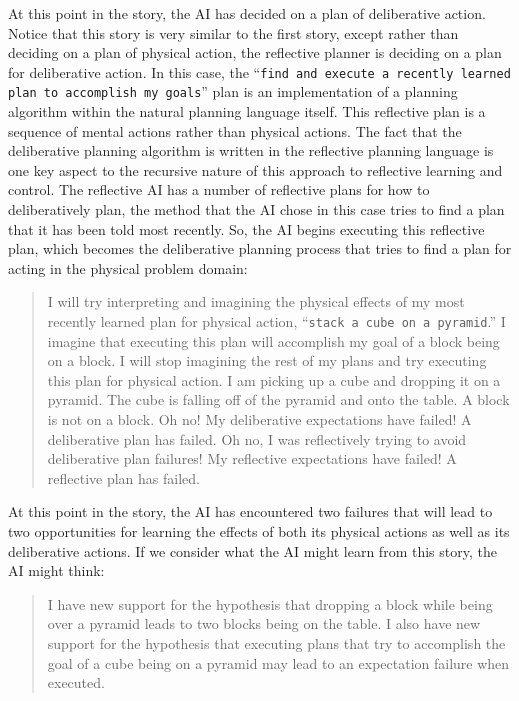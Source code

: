 At this point in the story, the AI has decided on a plan of
deliberative action.  Notice that this story is very similar to the
first story, except rather than deciding on a plan of physical action,
the reflective planner is deciding on a plan for deliberative action.
In this case, the ``{\tt{find and execute a recently learned plan to
    accomplish my goals}}'' plan is an implementation of a planning
algorithm within the natural planning language itself.  This
reflective plan is a sequence of mental actions rather than physical
actions.  The fact that the deliberative planning algorithm is written
in the reflective planning language is one key aspect to the recursive
nature of this approach to reflective learning and control.  The
reflective AI has a number of reflective plans for how to
deliberatively plan, the method that the AI chose in this case tries
to find a plan that it has been told most recently.  So, the AI begins
executing this reflective plan, which becomes the deliberative
planning process that tries to find a plan for acting in the physical
problem domain:
\begin{quote}
  I will try interpreting and imagining the physical effects of my
  most recently learned plan for physical action, ``{\tt{stack a cube
      on a pyramid}}.''  I imagine that executing this plan will
  accomplish my goal of a block being on a block.  I will stop
  imagining the rest of my plans and try executing this plan for
  physical action.  I am picking up a cube and dropping it on a
  pyramid.  The cube is falling off of the pyramid and onto the table.
  A block is not on a block.  Oh no!  My deliberative expectations
  have failed!  A deliberative plan has failed.  Oh no, I was
  reflectively trying to avoid deliberative plan failures!  My
  reflective expectations have failed!  A reflective plan has failed.
\end{quote}
At this point in the story, the AI has encountered two failures that
will lead to two opportunities for learning the effects of both its
physical actions as well as its deliberative actions.  If we consider
what the AI might learn from this story, the AI might think:
\begin{quote}
  I have new support for the hypothesis that dropping a block while
  being over a pyramid leads to two blocks being on the table.  I also
  have new support for the hypothesis that executing plans that try to
  accomplish the goal of a cube being on a pyramid may lead to an
  expectation failure when executed.
\end{quote}
